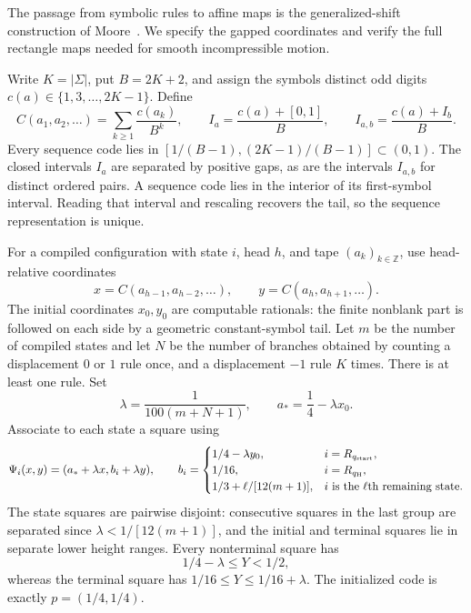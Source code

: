 \documentclass[11pt]{article}
\theoremstyle{remark}\newtheorem{remark}[theorem]{Remark}
\begin{document}
The passage from symbolic rules to affine maps is the generalized-shift
construction of Moore~\cite{Moore1990,Moore1991}. We specify the gapped coordinates and
verify the full rectangle maps needed for smooth incompressible motion.

Write $K=|\Sigma|$, put $B=2K+2$, and assign the symbols distinct odd
digits $c(a)\in\{1,3,\ldots,2K-1\}$.  Define
\[
 C(a_1,a_2,\ldots)=\sum_{k\ge1}\frac{c(a_k)}{B^k},
 \qquad I_a=\frac{c(a)+[0,1]}B,
 \qquad I_{a,b}=\frac{c(a)+I_b}B.
\]
Every sequence code lies in
$[1/(B-1),(2K-1)/(B-1)]\subset(0,1)$.  The closed intervals
$I_a$ are separated by positive gaps, as are the intervals $I_{a,b}$
for distinct ordered pairs.  A sequence code lies in the interior of
its first-symbol interval.  Reading that interval and rescaling
recovers the tail, so the sequence representation is unique.

For a compiled configuration with state $i$, head $h$, and tape
$(a_k)_{k\in\mathbb Z}$, use head-relative coordinates
\begin{equation}\label{eq:two-stack-code}
 x=C(a_{h-1},a_{h-2},\ldots),\qquad
 y=C(a_h,a_{h+1},\ldots).
\end{equation}
The initial coordinates $x_0,y_0$ are computable rationals: the finite
nonblank part is followed on each side by a geometric constant-symbol
tail.  Let $m$ be the number of compiled states and let $N$ be the number
of branches obtained by counting a displacement $0$ or $1$ rule once,
and a displacement $-1$ rule $K$ times.  There is at least one rule.
Set
\[
 \lambda=\frac1{100(m+N+1)},\qquad a_* =\frac14-\lambda x_0.
\]
Associate to each state a square using
\begin{equation}\label{eq:state-squares}
 \Psi_i(x,y)=(a_*+\lambda x,b_i+\lambda y),\qquad
 b_i=
 \begin{cases}
  1/4-\lambda y_0,&i=R_{q_{\rm start}},\\
  1/16,&i=R_{q_{\rm H}},\\
  1/3+\ell/[12(m+1)],&i\text{ is the }\ell\text{th remaining state}.
 \end{cases}
\end{equation}
The state squares are pairwise disjoint: consecutive squares in the
last group are separated since $\lambda<1/[12(m+1)]$, and the initial
and terminal squares lie in separate lower height ranges.  Every
nonterminal square has
\begin{equation}\label{eq:state-height-bounds}
 1/4-\lambda\le Y<1/2,
\end{equation}
whereas the terminal square has $1/16\le Y\le1/16+\lambda$.
The initialized code is exactly $p=(1/4,1/4)$.
\end{document}
